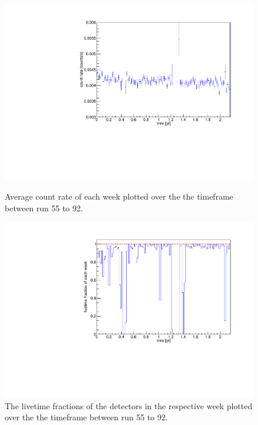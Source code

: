 \documentclass[encoding=utf8,british]{tumphthesis}
\begin{document}
\begin{figure}[t!]
	\centering
   	\begin{minipage}[t]{.475\textwidth}
		\centering
		\includegraphics[width=\textwidth]{./Bilder/eventRate.pdf}
		\caption{Average count rate of each week plotted over the the timeframe between run 55 to 92. }
		\label{fig:ChangeInEventRate}
	\end{minipage}\hfill%
	\begin{minipage}[t]{.475\textwidth}
		\centering
		\includegraphics[width=\textwidth]{./Bilder/onceInALivetime.pdf}
		\caption{The livetime fractions of the detectors in the respective week plotted over the the timeframe between run 55 to 92.}
		\label{fig:livetime}
	\end{minipage}
\vspace{5mm}
\end{figure}
\end{document}

